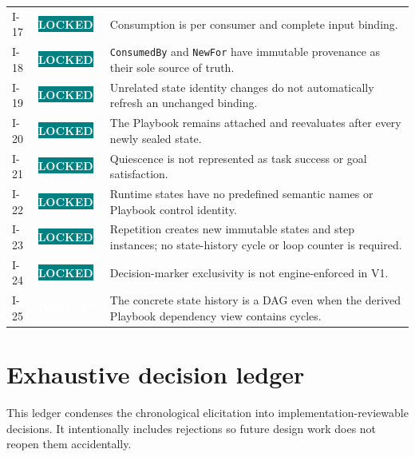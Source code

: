 \documentclass[11pt]{article}
\newcommand{\statuspill}[2]{%
  \begingroup\setlength{\fboxsep}{3pt}%
  \colorbox{#1}{\textcolor{white}{\sffamily\bfseries\scriptsize #2}}%
  \endgroup}
\newcommand{\Locked}{\statuspill{Teal}{LOCKED}}
\newcommand{\Derived}{\statuspill{Accent}{DERIVED}}
\newcommand{\artifact}[1]{\texttt{#1}}
\begin{document}
\begin{longtable}{@{}L{0.52in}L{0.88in}L{5.10in}@{}}
I-17 & \Locked & Consumption is per consumer and complete input binding. \\
I-18 & \Locked & \artifact{ConsumedBy} and \artifact{NewFor} have immutable provenance as their sole source of truth. \\
I-19 & \Locked & Unrelated state identity changes do not automatically refresh an unchanged binding. \\
I-20 & \Locked & The Playbook remains attached and reevaluates after every newly sealed state. \\
I-21 & \Locked & Quiescence is not represented as task success or goal satisfaction. \\
I-22 & \Locked & Runtime states have no predefined semantic names or Playbook control identity. \\
I-23 & \Locked & Repetition creates new immutable states and step instances; no state-history cycle or loop counter is required. \\
I-24 & \Locked & Decision-marker exclusivity is not engine-enforced in V1. \\
I-25 & \Derived & The concrete state history is a DAG even when the derived Playbook dependency view contains cycles. \\
\bottomrule
\end{longtable}

\section{Exhaustive decision ledger}

This ledger condenses the chronological elicitation into implementation-reviewable decisions. It intentionally includes rejections so future design work does not reopen them accidentally.
\end{document}
